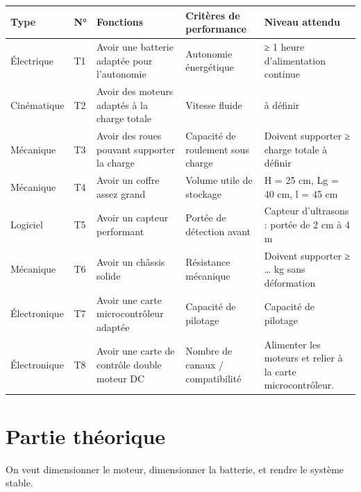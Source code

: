 \documentclass[a4paper,12pt]{report}  %
\begin{document}
{\fontsize{10pt}{12pt}\selectfont 
	\begin{longtable}{|l|l|p{4cm}|p{4cm}|p{4cm}|}
		\hline
		\textbf{Type} & \textbf{N°} & \textbf{Fonctions} 
		& \textbf{Critères de performance} & \textbf{Niveau attendu} \\
		\hline
		\endhead
		
		\hline
		\endfoot
		
		\hline
		Électrique & T1 & Avoir une batterie adaptée pour l'autonomie &
		Autonomie énergétique & ≥ 1 heure d'alimentation continue \\
		
		\hline
		Cinématique & T2 & Avoir des moteurs adaptés à la charge totale &
		Vitesse fluide & à définir \\
		
		\hline
		Mécanique & T3 & Avoir des roues pouvant supporter la charge & Capacité
		de roulement sous charge & Doivent supporter ≥ charge totale à définir \\
		
		\hline
		Mécanique & T4 & Avoir un coffre assez grand & Volume utile de stockage
		& H = 25 cm, Lg = 40 cm, l = 45 cm \\
		
		\hline
		Logiciel & T5 & Avoir un capteur performant & Portée de détection avant
		& Capteur d'ultrasons : portée de 2 cm à 4 m  \\
		
		\hline
		Mécanique & T6 & Avoir un châssis solide & Résistance mécanique &
		Doivent supporter ≥ \ldots{} kg sans déformation \\
		
		\hline
		Électronique & T7 & Avoir une carte microcontrôleur adaptée & Capacité
		de pilotage & Capacité de pilotage \\
		
		\hline
		Électronique & T8 & Avoir une carte de contrôle double moteur DC &
		Nombre de canaux / compatibilité & Alimenter les moteurs et relier à la
		carte microcontrôleur. \\
		
	\end{longtable}
}



\pagebreak
\section{Partie théorique}
On veut dimensionner le moteur, dimensionner la batterie, et rendre le système stable. 
\end{document}
